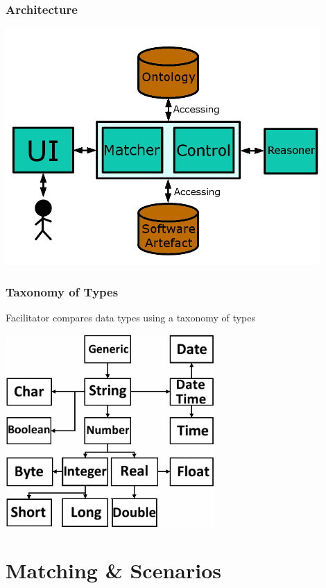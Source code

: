 \documentclass{beamer}
\begin{document}
\begin{frame}
\frametitle{Architecture}
\centerline{\includegraphics[width=0.9\textwidth]{SoftwareArchitecture}}
\end{frame}

\begin{frame}
\frametitle{Taxonomy of Types}
Facilitator compares data types using a taxonomy of types\newline{}
\newline{}
\centerline{\includegraphics[width=0.6\textwidth]{TaxonomyOfTypes}}
\end{frame}

\section{Matching \& Scenarios}
\subsection{}
\end{document}
